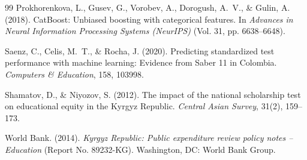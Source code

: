\documentclass[12pt,letterpaper]{report}
\begin{document}
\begin{singlespace}
\begin{thebibliography}{99}
Prokhorenkova, L., Gusev, G., Vorobev, A., Dorogush, A.~V., \& Gulin, A. (2018). CatBoost: Unbiased boosting with categorical features. In \textit{Advances in Neural Information Processing Systems (NeurIPS)} (Vol. 31, pp. 6638--6648).

Saenz, C., Celis, M.~T., \& Rocha, J. (2020). Predicting standardized test performance with machine learning: Evidence from Saber 11 in Colombia. \textit{Computers \& Education}, 158, 103998.

Shamatov, D., \& Niyozov, S. (2012). The impact of the national scholarship test on educational equity in the Kyrgyz Republic. \textit{Central Asian Survey}, 31(2), 159--173.

World Bank. (2014). \textit{Kyrgyz Republic: Public expenditure review policy notes -- Education} (Report No. 89232-KG). Washington, DC: World Bank Group.

\end{thebibliography}
\end{singlespace}
\end{document}
